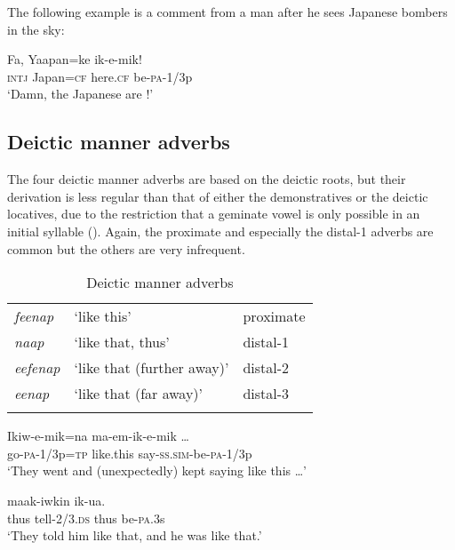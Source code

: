 The following example is a comment from a man after he sees Japanese bombers in the sky:

\ea%
\label{ex:3:x1572}
\gll Fa, Yaapan=ke  ik-e-mik! \\
\textsc{intj} Japan=\textsc{cf} here.\textsc{cf} be-\textsc{pa}-1/3p\\
\glt`Damn, the Japanese are !'
\z

\subsection{Deictic manner adverbs}\label{sec:3.6.4}
{}
The four deictic manner adverbs are based on the deictic roots, but their derivation is less regular than that of either the demonstratives or the deictic locatives, due to the restriction that a geminate vowel is only possible in an initial syllable (). Again, the proximate  and especially the distal-1 adverbs  are common but the others are very infrequent.

\begin{table}
\caption{Deictic manner adverbs}
\label{tab:3:deicticmanneradv}
 
\begin{tabular}{>{\itshape}lll}
\mytoprule
feenap &`like this' &proximate\\
naap &`like that, thus' &distal-1\\
eefenap &`like that (further away)' &distal-2\\
eenap &`like that (far away)' &distal-3\\
\mybottomrule
\end{tabular}
\end{table}


\ea%
\label{ex:3:x701}
\gll Ikiw-e-mik=na  ma-em-ik-e-mik {\dots} \\
go-\textsc{pa}-1/3p=\textsc{tp} like.this say-\textsc{ss}.\textsc{sim}-be-\textsc{pa}-1/3p\\
\glt`They went and (unexpectedly) kept saying like this {\dots}'
\z

\ea%
\label{ex:3:x702}
\gll {} maak-iwkin  ik-ua. \\
thus tell-2/3.\textsc{ds} thus be-\textsc{pa}.3s\\
\glt`They told him like that, and he was like that.'
\z

